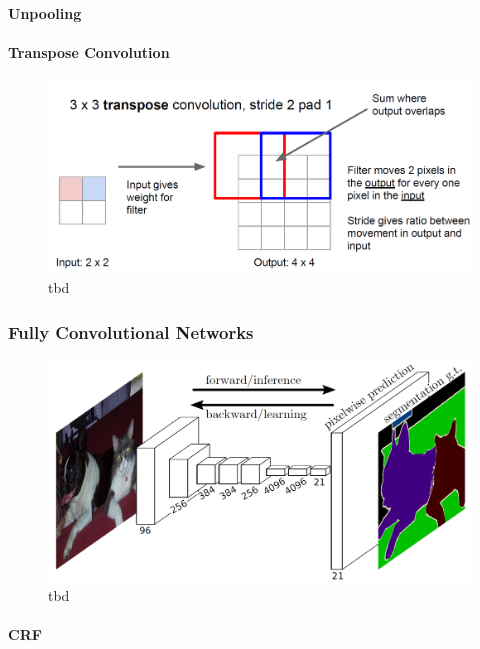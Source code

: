 \paragraph{Unpooling}
\cite{Li17-StanfordLecture}
\cite{NHH15-DeConvNet}

\paragraph{Transpose Convolution}
\cite{Dum18-ConvolutionArithmetic}

\begin{figure}
	\includegraphics[width=\linewidth]{figures/chap223_TransposeConv.png}
	\caption{tbd}
	\label{fig:ch2:sec2:transpose-conv}
\end{figure}

\subsubsection{Fully Convolutional Networks}
\cite{LSD15-FCN}
\begin{figure}
	\includegraphics[width=\linewidth]{figures/chap223_FCN.png}
	\caption{tbd}
	\label{fig:ch2:sec2:fcn}
\end{figure}

\paragraph{CRF}
\cite{Chen16-DeepLab}
\cite{KK12-CRF}


